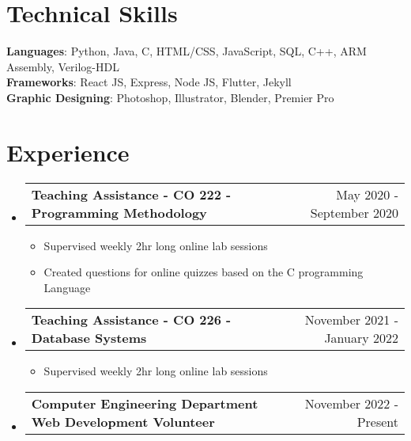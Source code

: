 \documentclass[letterpaper,11pt]{article}
\makeatletter
\newcommand{\resumeListHeading}[2]{
    \item
    \begin{tabular*}{1.001\textwidth}{l@{\extracolsep{\fill}}r}
      \small#1 & {\small #2}\\
    \end{tabular*}\vspace{-15pt}
}
\newcommand{\resumeSubHeadingListStart}{\begin{itemize}[leftmargin=0.0in, label={}]}
\newcommand{\resumeSubHeadingListEnd}{\end{itemize}}
\makeatother
\begin{document}
%
\section{Technical Skills}
 \begin{itemize}[leftmargin=0.15in, label={}]
    \small{\item{
     \textbf{Languages}{: Python, Java, C, HTML/CSS, JavaScript, SQL, C++, ARM Assembly, Verilog-HDL} \\
     \textbf{Frameworks}{: React JS, Express, Node JS, Flutter, Jekyll} \\
     \textbf{Graphic Designing}{: Photoshop, Illustrator, Blender, Premier Pro}
    }}
 \end{itemize}
 \vspace{-16pt}
 
\section{Experience}
    \vspace{-5pt}
    \resumeSubHeadingListStart
      \resumeListHeading{\textbf{Teaching Assistance - CO 222 - Programming Methodology}}{May 2020 - September 2020}
      \vspace*{2.0\multicolsep}
      \begin{itemize}[ itemsep=-1pt]
        \item Supervised weekly 2hr long online lab sessions
        \item Created questions for online quizzes based on the C programming Language
      \end{itemize}
      \vspace{-18pt}
      \resumeListHeading{\textbf{Teaching Assistance - CO 226 - Database Systems}}{November 2021 - January 2022}
      \vspace*{2.0\multicolsep}
      \begin{itemize}[ itemsep=-1pt]
        \item Supervised weekly 2hr long online lab sessions
      \end{itemize}
      \vspace{-18pt}
      \resumeListHeading{\textbf{Computer Engineering Department Web Development Volunteer}}{November 2022 - Present}
          
          \vspace{-13pt}
          
    \resumeSubHeadingListEnd
\vspace{3pt}
\end{document}
